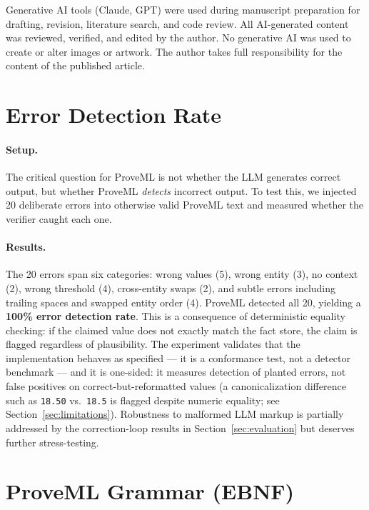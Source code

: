 \documentclass[11pt,a4paper]{article}
\begin{document}
Generative AI tools (Claude, GPT) were used during manuscript preparation for drafting, revision, literature search, and code review. All AI-generated content was reviewed, verified, and edited by the author. No generative AI was used to create or alter images or artwork. The author takes full responsibility for the content of the published article.




\appendix

\section{Error Detection Rate}
\label{sec:detection}

\paragraph{Setup.} The critical question for ProveML is not whether the LLM generates correct output, but whether ProveML \textit{detects} incorrect output. To test this, we injected 20 deliberate errors into otherwise valid ProveML text and measured whether the verifier caught each one.

\paragraph{Results.} The 20 errors span six categories: wrong values (5), wrong entity (3), no context (2), wrong threshold (4), cross-entity swaps (2), and subtle errors including trailing spaces and swapped entity order (4). ProveML detected all 20, yielding a \textbf{100\% error detection rate}. This is a consequence of deterministic equality checking: if the claimed value does not exactly match the fact store, the claim is flagged regardless of plausibility. The experiment validates that the implementation behaves as specified --- it is a conformance test, not a detector benchmark --- and it is one-sided: it measures detection of planted errors, not false positives on correct-but-reformatted values (a canonicalization difference such as \texttt{18.50} vs.\ \texttt{18.5} is flagged despite numeric equality; see Section~\ref{sec:limitations}). Robustness to malformed LLM markup is partially addressed by the correction-loop results in Section~\ref{sec:evaluation} but deserves further stress-testing.

\section{ProveML Grammar (EBNF)}
\label{app:grammar}
\end{document}
